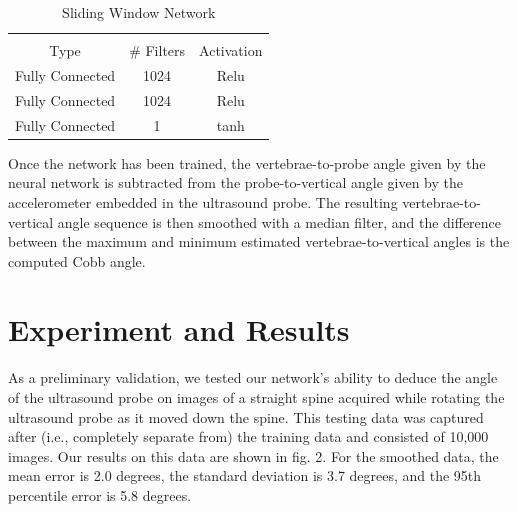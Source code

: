 \documentclass{article}
\begin{document}
\begin{table}[ht]
\caption{Sliding Window Network}
\begin{tabular}{c c c}
\hline \\
Type & \# Filters & Activation \\
\hline
Fully Connected & 1024  & Relu \\
Fully Connected & 1024  & Relu \\
Fully Connected & 1 &  tanh \\
\end{tabular}
\end{table}

Once the network has been trained, the vertebrae-to-probe angle given by the neural network is subtracted from the probe-to-vertical angle given by the accelerometer embedded in the ultrasound probe. The resulting vertebrae-to-vertical angle sequence is then smoothed with a median filter, and the difference between the maximum and minimum estimated vertebrae-to-vertical angles is the computed Cobb angle.   

\section{Experiment and Results}

As a preliminary validation, we tested our network’s ability to deduce the angle of the ultrasound probe on images of a straight spine acquired while rotating the ultrasound probe as it moved down the spine.  This testing data was captured after (i.e., completely separate from) the training data and consisted of 10,000 images. Our results on this data are shown in fig. 2. For the smoothed data, the mean error is 2.0 degrees, the standard deviation is 3.7 degrees, and the 95th percentile error is 5.8 degrees. 
\end{document}
